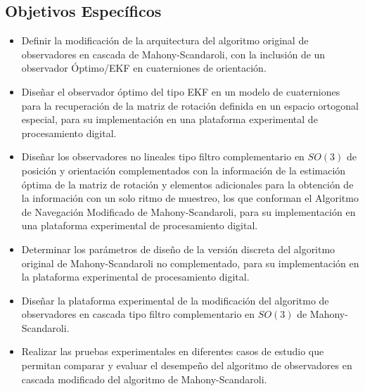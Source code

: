 \documentclass[10pt]{report}
\numberwithin{equation}{chapter}
\numberwithin{algorithm}{chapter}
\begin{document}
\subsection{Objetivos Específicos}
\begin{itemize}
\item Definir la modificación de la arquitectura del algoritmo original de observadores en cascada de Mahony-Scandaroli, con la inclusión de un observador Óptimo/EKF en cuaterniones de orientación.
\item Diseñar el observador óptimo del tipo EKF en un modelo de cuaterniones para la recuperación de la matriz de rotación definida en un espacio ortogonal especial, para su implementación en una plataforma experimental de procesamiento digital.
\item Diseñar los observadores no lineales tipo filtro complementario en $SO(3)$ de posición y orientación complementados con la información de la estimación óptima de la matriz de rotación y elementos adicionales para la obtención de la información con un solo ritmo de muestreo, los que conforman el Algoritmo de Navegación Modificado de Mahony-Scandaroli, para su implementación en una plataforma experimental de procesamiento digital.
\item Determinar los parámetros de diseño de la versión discreta del algoritmo original de Mahony-Scandaroli no complementado, para su implementación en la plataforma experimental de procesamiento digital.
\item Diseñar la plataforma experimental de la modificación del algoritmo de observadores en cascada tipo filtro complementario en $SO(3)$ de Mahony-Scandaroli.
\item Realizar las pruebas experimentales en diferentes casos de estudio que permitan comparar y evaluar el desempeño del algoritmo de observadores en cascada modificado del algoritmo de Mahony-Scandaroli.
\end{itemize}
\end{document}
